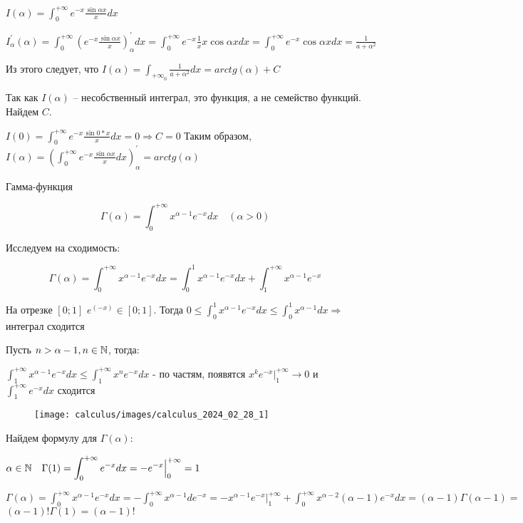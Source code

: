 \documentclass[12pt]{article}
\begin{document}
    \Ex $\displaystyle I(\alpha) = \int^{+\infty}_0 e^{-x} \frac{\sin\alpha x}{x}dx$

    $\displaystyle I^\prime_\alpha(\alpha) = \int^{+\infty}_0 \left(e^{-x} \frac{\sin\alpha x}{x}\right)^\prime_\alpha dx = \int^{+\infty}_0 e^{-x} \frac{1}{x} x \cos\alpha x dx =
    \int^{+\infty}_0 e^{-x} \cos\alpha x dx = \frac{1}{a + \alpha^2}$

    Из этого следует, что $\displaystyle I(\alpha) = \int_{+\infty}_{0} \frac{1}{a + \alpha^2} dx = arctg(\alpha) + C$

    Так как $I(\alpha)$ -- несобственный интеграл, это функция, а не семейство функций. Найдем $C$.

    $\displaystyle I(0) = \int^{+\infty}_0 e^{-x} \frac{\sin 0 * x}{x}dx = 0 \Longrightarrow C = 0$
    Таким образом, $\displaystyle I(\alpha) = \left(\int^{+\infty}_0 e^{-x} \frac{\sin\alpha x}{x} dx\right)^\prime_\alpha = arctg(\alpha)$

    \Ex Гамма-функция

    \[\Gamma(\alpha) = \int^{+\infty}_0 x^{\alpha - 1} e^{-x} dx \quad (\alpha > 0)\]

    Исследуем на сходимость:

    \[\Gamma(\alpha) = \int^{+\infty}_0 x^{\alpha - 1} e^{-x} dx = \int^{1}_0 x^{\alpha - 1} e^{-x} dx + \int^{+\infty}_1 x^{\alpha - 1} e^{-x}\]

    На отрезке $[0; 1]$ $e^(-x) \in [0;1]$.
    Тогда $\displaystyle 0 \leq \int^{1}_0 x^{\alpha - 1} e^{-x} dx \leq \int^{1}_0 x^{\alpha - 1} dx \Longrightarrow$ интеграл сходится

    Пусть $n > \alpha - 1, n \in \mathbb{N}$, тогда:

    $\displaystyle \int^{+\infty}_1 x^{\alpha - 1} e^{-x} dx \leq \int^{+\infty}_1 x^{n} e^{-x} dx$ - по частям, появятся $\displaystyle x^{k} e^{-x} \Big|^{+\infty}_1 \rightarrow 0$ и $\displaystyle \int^{+\infty}_1 e^{-x} dx$ сходится

    \begin{wrapfigure}{r}{0pt}
        \texttt{[image: calculus/images/calculus\_2024\_02\_28\_1]}
    \end{wrapfigure}
    Найдем формулу для $\Gamma(\alpha)$:

    $\displaystyle \alpha \in \mathbb{N} \quad \Gamma(1) = \int^{+\infty}_0 e^{-x} dx = -e^{-x} \Big|^{+\infty}_{0} = 1$

    $\displaystyle \Gamma(\alpha) = \int^{+\infty}_0 x^{\alpha - 1} e^{-x} dx = -\int^{+\infty}_0 x^{\alpha - 1} de^{-x} = -x^{\alpha - 1}e^{-x} \Big|^{+\infty}_1 + \int^{+\infty}_0 x^{\alpha - 2} (\alpha - 1) e^{-x} dx = (\alpha - 1) \Gamma(\alpha - 1) = $
    $(\alpha - 1)! \Gamma(1) = (\alpha - 1)!$
\end{document}
